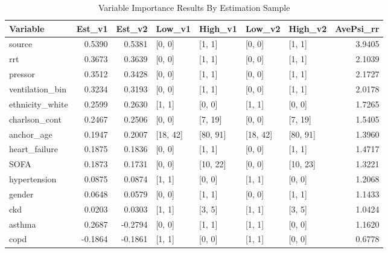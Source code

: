 \begin{table}[ht]
\centering
\caption{Variable Importance Results By Estimation Sample} 
\label{byFold}
\begin{tabular}{lrrllllr}
  \hline
Variable & Est\_v1 & Est\_v2 & Low\_v1 & High\_v1 & Low\_v2 & High\_v2 & AvePsi\_rr \\ 
  \hline
source & 0.5390 & 0.5381 & [0, 0] & [1, 1] & [0, 0] & [1, 1] & 3.9405 \\ 
  rrt & 0.3673 & 0.3639 & [0, 0] & [1, 1] & [0, 0] & [1, 1] & 2.1039 \\ 
  pressor & 0.3512 & 0.3428 & [0, 0] & [1, 1] & [0, 0] & [1, 1] & 2.1727 \\ 
  ventilation\_bin & 0.3234 & 0.3193 & [0, 0] & [1, 1] & [0, 0] & [1, 1] & 2.0178 \\ 
  ethnicity\_white & 0.2599 & 0.2630 & [1, 1] & [0, 0] & [1, 1] & [0, 0] & 1.7265 \\ 
  charlson\_cont & 0.2467 & 0.2506 & [0, 0] & [7, 19] & [0, 0] & [7, 19] & 1.5405 \\ 
  anchor\_age & 0.1947 & 0.2007 & [18, 42] & [80, 91] & [18, 42] & [80, 91] & 1.3960 \\ 
  heart\_failure & 0.1875 & 0.1836 & [0, 0] & [1, 1] & [0, 0] & [1, 1] & 1.4717 \\ 
  SOFA & 0.1873 & 0.1731 & [0, 0] & [10, 22] & [0, 0] & [10, 23] & 1.3221 \\ 
  hypertension & 0.0875 & 0.0874 & [1, 1] & [0, 0] & [1, 1] & [0, 0] & 1.2068 \\ 
  gender & 0.0648 & 0.0579 & [0, 0] & [1, 1] & [0, 0] & [1, 1] & 1.1433 \\ 
  ckd & 0.0203 & 0.0303 & [1, 1] & [3, 5] & [1, 1] & [3, 5] & 1.0424 \\ 
  asthma & 0.2687 & -0.2794 & [0, 0] & [1, 1] & [1, 1] & [0, 0] & 1.1620 \\ 
  copd & -0.1864 & -0.1861 & [1, 1] & [0, 0] & [1, 1] & [0, 0] & 0.6778 \\ 
   \hline
\end{tabular}
\end{table}
